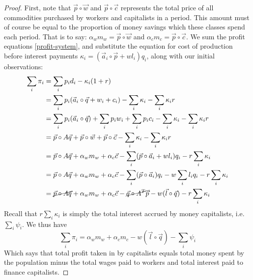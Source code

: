 \documentclass{article}
\theoremstyle{definition}
\begin{document}
\begin{proof}
    First, note that $\vec{p}\circ\vec{w}$ and $\vec{p}\circ\vec{c}$ represents the total price of all commodities purchased by workers and capitalists in a period. This amount must of course be equal to the proportion of money savings which these classes spend each period. That is to say: $\alpha_w m_w = \vec{p}\circ\vec{w}$ and $\alpha_c m_c = \vec{p}\circ\vec{c}$. We sum the profit equations \ref{profit-system}, and substitute the equation for cost of production before interest payments $\kappa_i = (\vec{a}_i \circ \vec{p}+wl_i)q_i$, along with our initial observations:
    \begin{align}
        \sum_i \pi_i &= \sum_i p_id_i - \kappa_i(1+r) \\
                     &= \sum_i p_i(\vec{a}_i\circ\vec{q}+w_i+c_i) - \sum_i \kappa_i - \sum_i \kappa_ir \\
                     &= \sum_i p_i (\vec{a}_i \circ \vec{q}) + \sum_i p_iw_i + \sum_i p_ic_i -\sum_i\kappa_i - \sum_i\kappa_ir \\
                     &= \vec{p} \circ A\vec{q} + \vec{p}\circ\vec{w} + \vec{p}\circ\vec{c}-\sum_i \kappa_i - \sum_i \kappa_ir \\
                     &= \vec{p}\circ A\vec{q}+\alpha_wm_w + \alpha_c \vec{c} - \sum_i (\vec{p}\circ\vec{a}_i+wl_i)q_i - r\sum_i \kappa_i  \\
                     &= \vec{p}\circ A\vec{q}+\alpha_wm_w + \alpha_c \vec{c} - \sum_i (\vec{p}\circ\vec{a}_i)q_i - w\sum_i l_iq_i - r\sum_i \kappa_i \\
                     &= \cancel{\vec{p}\circ A\vec{q}} + \alpha_w m_w +\alpha_c \vec{c} - \cancel{\vec{q}\circ A^T\vec{p}} - w(\vec{l}\circ\vec{q}) - r\sum_i \kappa_i
    \end{align}
    Recall that $r\sum_i \kappa_i$ is simply the total interest accrued by money capitalists, i.e. $\sum_i \psi_i$. We thus have
    \begin{equation}
        \sum_i \pi_i = \alpha_w m_w + \alpha_c m_c - w(\vec{l}\circ\vec{q}) - \sum_i \psi_i \label{total-profit}
    \end{equation}
    Which says that total profit taken in by capitalists equals total money spent by the population minus the total wages paid to workers and total interest paid to finance capitalists. 
    

\end{proof}
\end{document}
